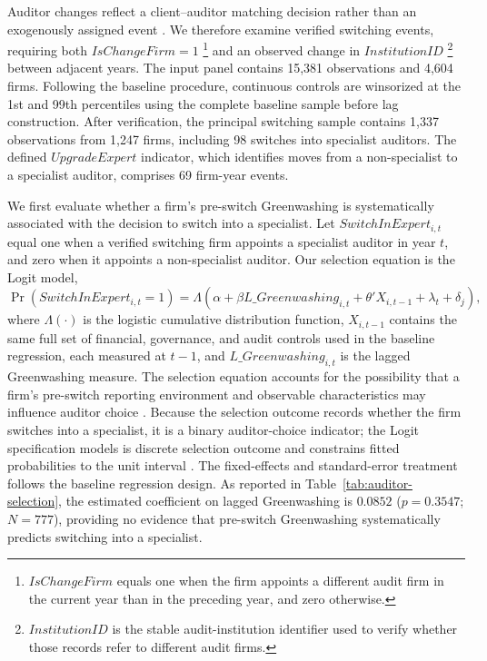 \documentclass[11pt]{article}
\begin{document}
Auditor changes reflect a client--auditor matching decision rather than an exogenously assigned event \citep{defondsubramanyam1998}. 
We therefore examine verified switching events, requiring both \(IsChangeFirm=1\) \footnote{\(IsChangeFirm\) equals one when the firm appoints a different audit firm in the current year than in the preceding year, and zero otherwise. } and an observed change in \(InstitutionID\) \footnote{\(InstitutionID\) is the stable audit-institution identifier used to verify whether those records refer to different audit firms.} between adjacent years. 
The input panel contains 15,381 observations and 4,604 firms. Following the baseline procedure, continuous controls are winsorized at the 1st and 99th percentiles using the complete baseline sample before lag construction. After verification, the principal switching sample contains 1,337 observations from 1,247 firms, including 98 switches into specialist auditors. The defined \(UpgradeExpert\) indicator, which identifies moves from a non-specialist to a specialist auditor, comprises 69 firm-year events.


We first evaluate whether a firm's pre-switch Greenwashing is systematically associated with the decision to switch into a specialist. 
Let \(SwitchInExpert_{i,t}\) equal one when a verified switching firm appoints a specialist auditor in year \(t\), and zero when it appoints a non-specialist auditor. 
Our selection equation is the Logit model,
\[
\Pr(SwitchInExpert_{i,t}=1)=\Lambda\left(\alpha+\beta L\_Greenwashing_{i,t}+\theta'X_{i,t-1}+\lambda_t+\delta_j\right),
\]
where \(\Lambda(\cdot)\) is the logistic cumulative distribution function, \(X_{i,t-1}\) contains the same full set of financial, governance, and audit controls used in the baseline regression, each measured at \(t-1\), and \(L\_Greenwashing_{i,t}\) is the lagged Greenwashing measure. 
The selection equation accounts for the possibility that a firm's pre-switch reporting environment and observable characteristics may influence auditor choice \citep{defondsubramanyam1998}. 
Because the selection outcome records whether the firm switches into a specialist, it is a binary auditor-choice indicator; the Logit specification models is discrete selection outcome and constrains fitted probabilities to the unit interval \citep{wooldridge2010econometric}. 
The fixed-effects and standard-error treatment follows the baseline regression design.
As reported in Table~\ref{tab:auditor-selection}, the estimated coefficient on lagged Greenwashing is \(0.0852\) (\(p=0.3547\); \(N=777\)), providing no evidence that pre-switch Greenwashing systematically predicts switching into a specialist. 
\end{document}
